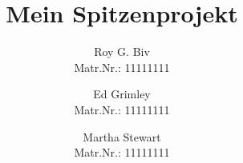 \title{Mein Spitzenprojekt}


\author{Roy G. Biv\\ %
        \scriptsize Matr.Nr.: 11111111 %
\and Ed Grimley\\ %
     \scriptsize Matr.Nr.: 11111111
\and Martha Stewart\\ %
     \scriptsize Matr.Nr.: 11111111}

